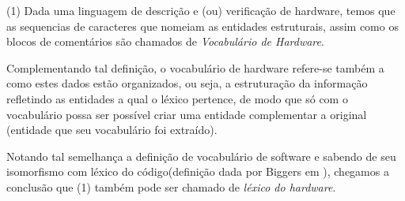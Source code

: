 \documentclass[12pt, twocolumn, a4paper]{article}
\begin{document}
(1) Dada uma linguagem de descrição e (ou) verificação de hardware, temos que as sequencias de caracteres que nomeiam as entidades estruturais, assim como os blocos de comentários são chamados de \textit{Vocabulário de Hardware}.

Complementando tal definição, o vocabulário de hardware refere-se também a como estes dados estão organizados, ou seja, a estruturação da informação refletindo as entidades a qual o léxico pertence, de modo que só com o vocabulário possa ser possível criar uma entidade complementar a original (entidade que seu vocabulário foi extraído).

Notando tal semelhança a definição de vocabulário de software e sabendo de seu isomorfismo com léxico do código(definição dada por Biggers em \cite{Biggers2011}), chegamos a conclusão que (1) também pode ser chamado de \textit{léxico do hardware}.
\end{document}
